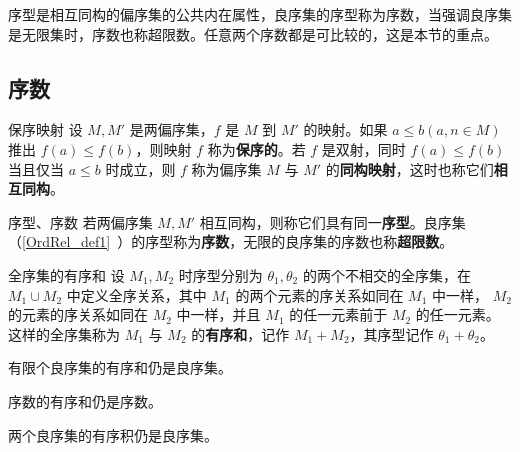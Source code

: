 序型是相互同构的偏序集的公共内在属性，良序集的序型称为序数，当强调良序集是无限集时，序数也称超限数。任意两个序数都是可比较的，这是本节的重点。
\subsection{序数}
\begin{definition}{保序映射}
设 $M,M'$ 是两偏序集，$f$ 是 $M$ 到 $M'$ 的映射。如果 $a\leq b(a,n\in M)$ 推出 $f(a)\leq f(b)$，则映射 $f$ 称为\textbf{保序的}。若 $f$ 是双射，同时 $f(a)\leq f(b)$ 当且仅当 $a\leq b$ 时成立，则 $f$ 称为偏序集 $M$ 与 $M'$ 的\textbf{同构映射}，这时也称它们\textbf{相互同构}。
\end{definition}
\begin{definition}{序型、序数}
若两偏序集 $M,M'$ 相互同构，则称它们具有同一\textbf{序型}。良序集（\autoref{OrdRel_def1}~）的序型称为\textbf{序数}，无限的良序集的序数也称\textbf{超限数}。
\end{definition}
\begin{definition}{全序集的有序和}
设 $M_1,M_2$ 时序型分别为 $\theta_1,\theta_2$ 的两个不相交的全序集，在 $M_1\cup M_2$ 中定义全序关系，其中 $M_1$ 的两个元素的序关系如同在 $M_1$ 中一样， $M_2$ 的元素的序关系如同在 $M_2$ 中一样，并且 $M_1$ 的任一元素前于 $M_2$ 的任一元素。这样的全序集称为 $M_1$ 与 $M_2$ 的\textbf{有序和}，记作 $M_1+M_2$，其序型记作 $\theta_1+\theta_2$。
\end{definition}
\begin{theorem}{}
有限个良序集的有序和仍是良序集。
\end{theorem}
\begin{corollary}{}
序数的有序和仍是序数。
\end{corollary}
\begin{theorem}{}
两个良序集的有序积仍是良序集。
\end{theorem}